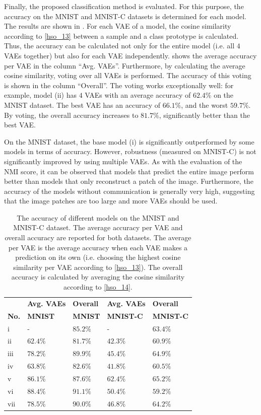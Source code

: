 Finally, the proposed classification method is evaluated. For this purpose, the accuracy on the MNIST and MNIST-C datasets is determined for each model. The results are shown in .
For each VAE of a model, the cosine similarity according to \eqref{hso_13} between a sample and a class prototype is calculated. Thus, the accuracy can be calculated not only for the entire model (i.e. all $4$ VAEs together) but also for each VAE independently.  shows the average accuracy per VAE in the column ``Avg. VAEs''. Furthermore, by calculating the average cosine similarity, voting over all VAEs is performed. The accuracy of this voting is shown in the column ``Overall''. The voting works exceptionally well: for example, model (ii) has $4$ VAEs with an average accuracy of $62.4\%$ on the MNIST dataset. The best VAE has an accuracy of $66.1\%$, and the worst $59.7\%$. By voting, the overall accuracy increases to $81.7\%$, significantly better than the best VAE.

On the MNIST dataset, the base model (i) is significantly outperformed by some models in terms of accuracy. However, robustness (measured on MNIST-C) is not significantly improved by using multiple VAEs. As with the evaluation of the NMI score, it can be observed that models that predict the entire image perform better than models that only reconstruct a patch of the image. Furthermore, the accuracy of the models without communication is generally very high, suggesting that the image patches are too large and more VAEs should be used.



\begin{table}[h] 
    \centering
	 \begin{tabular}{l l l l l}
	 	& \textbf{Avg. VAEs} & \textbf{Overall} & \textbf{Avg. VAEs} & \textbf{Overall}\\
    	\textbf{No.} & \textbf{MNIST} & \textbf{MNIST} & \textbf{MNIST-C} & \textbf{MNIST-C}\\
        \hline
		i & - & $85.2\%$ & - & $63.4\%$ \\
		ii & $62.4\%$ & $81.7\%$ & $42.3\%$ & $60.9\%$ \\
		iii & $78.2\%$ & $89.9\%$ & $45.4\%$ & $64.9\%$ \\
		iv & $63.8\%$ & $82.6\%$ & $41.8\%$ & $60.5\%$  \\
		v & $86.1\%$ & $87.6\%$ & $62.4\%$ & $65.2\%$ \\
		vi & $88.4\%$ & $91.1\%$ & $50.4\%$ & $59.2\%$ \\
		vii & $78.5\%$ & $90.0\%$ & $46.8\%$ & $64.2\%$ \\
    \end{tabular}
    \caption[Accuracy of different architectures]{The accuracy of different models on the MNIST and MNIST-C dataset. The average accuracy per VAE and overall accuracy are reported for both datasets. The average per VAE is the average accuracy when each VAE makes a prediction on its own (i.e. choosing the highest cosine similarity per VAE according to \eqref{hso_13}). The overall accuracy is calculated by averaging the cosine similarity according to \eqref{hso_14}.}
\end{table}

